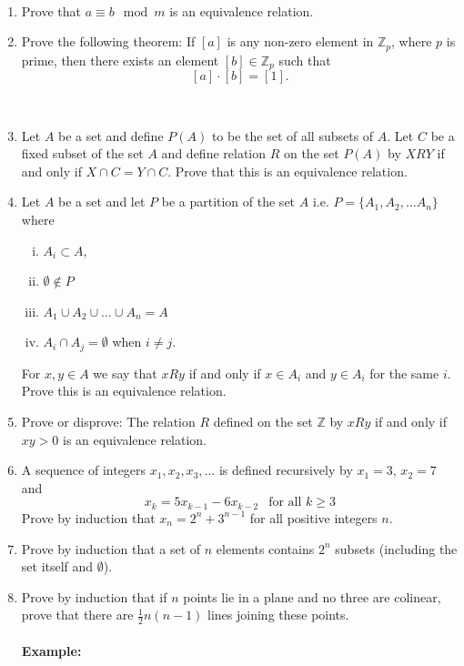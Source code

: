 \documentclass[12pt,letterpaper]{article}
\newcommand{\zz}{\mathbb Z}    %
\theoremstyle{plain}
\theoremstyle{definition}
\begin{document}
\ \\
\begin{enumerate}[1.]
\item Prove that $a\equiv b \mod m$ is an equivalence relation. 
\ \\
\item Prove the following theorem: If $[a]$ is any non-zero element in $\mathbb{Z}_p$, where $p$ is prime, then there exists an element $[b]\in \zz_p$ such that 
\[[a]\cdot [b]=[1].\]

\ \\
\item Let $A$ be a set and define $P(A)$ to be the set of all subsets of $A$. Let $C$ be a fixed subset of the set $A$ and define relation $R$ on the set $P(A)$ by $X R Y$ if and only if $X\cap C=Y\cap C$. Prove that this is an equivalence relation. 
\ \\
\item Let $A$ be a set and let $P$ be a partition of the set $A$ i.e. $P=\{A_1, A_2, \ldots A_n\}$ where 
\begin{enumerate}[i)]
\item $A_i\subset A$, 
\item $\emptyset \not \in P$
\item $A_1\cup A_2\cup \ldots \cup A_n=A$ 
\item $A_i\cap A_j =\emptyset $ when $i\neq j$. 
\end{enumerate}
For $x,y \in A$ we say that $x R y$ if and only if $x\in A_i$ and $y\in A_i$ for the same $i$. Prove this is an equivalence relation. 
\ \\
\item Prove or disprove: The relation $R$ defined on the set $\mathbb{Z}$ by $x R y$ if and only if $xy>0$ is an equivalence relation. 
\ \\
\item A sequence of integers $x_1, x_2, x_3,\ldots $ is defined recursively by $x_1=3$, $x_2=7$ and
\[x_k=5x_{k-1}-6x_{k-2}\ \ \text{ for all }k\geq 3\]
Prove by induction that $x_n=2^n+3^{n-1}$ for all positive integers $n$. 
\ \\
\item Prove by induction that a set of $n$ elements contains $2^n$ subsets (including the set itself and $\emptyset$).
\ \\
\item Prove by induction that if $n$ points lie in a plane and no three are colinear, prove that there are $\frac{1}{2}n(n-1)$ lines joining these points. \\
\ \\
{\bf Example: }
\begin{center}
\end{center}


\end{enumerate}
\end{document}
